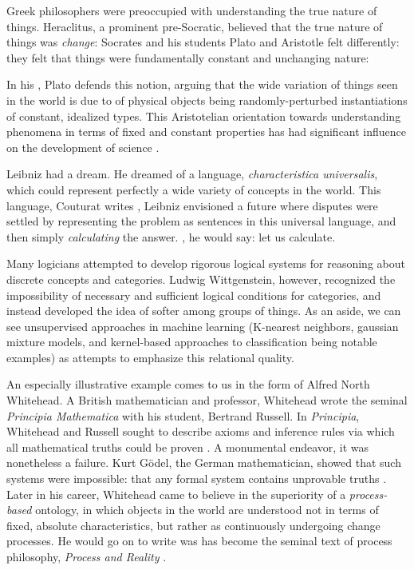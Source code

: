 \documentclass[12pt]{book}
\begin{document}
\bigskip

Greek philosophers were preoccupied with understanding the true nature of things.
Heraclitus, a prominent pre-Socratic, believed that the true nature of things was \textit{change}: 
Socrates and his students Plato and Aristotle felt differently: they felt that things were fundamentally constant and unchanging nature: 

In his , Plato defends this notion, arguing that the wide variation of things seen in the world is due to of physical objects being randomly-perturbed instantiations of constant, idealized types.
This Aristotelian orientation towards understanding phenomena in terms of fixed and constant properties has had significant influence on the development of science \cite{pirsig}.

\bigskip

Leibniz had a dream.
He dreamed of a language, \textit{characteristica universalis}, which could represent perfectly a wide variety of concepts in the world.
This language, Couturat writes \cite{couturat}, 
Leibniz envisioned a future where disputes were settled by representing the problem as sentences in this universal language, and then simply \textit{calculating} the answer.
, he would say: let us calculate.

Many logicians attempted to develop rigorous logical systems for reasoning about discrete concepts and categories.
Ludwig Wittgenstein, however, recognized the impossibility of necessary and sufficient logical conditions for categories, and instead developed the idea of softer  among groups of things.
As an aside, we can see unsupervised approaches in machine learning (K-nearest neighbors, gaussian mixture models, and kernel-based approaches to classification being notable examples) as attempts to emphasize this relational quality.

\bigskip

An especially illustrative example comes to us in the form of Alfred North Whitehead.
A British mathematician and professor, Whitehead wrote the seminal \textit{Principia Mathematica} with his student, Bertrand Russell.
In \textit{Principia}, Whitehead and Russell sought to describe axioms and inference rules via which all mathematical truths could be proven \cite{doxiadis}.
A monumental endeavor, it was nonetheless a failure.
Kurt G{\"o}del, the German mathematician, showed that such systems were impossible: that any formal system contains unprovable truths \cite{hofstadter}.
Later in his career, Whitehead came to believe in the superiority of a \textit{process-based} ontology, in which objects in the world are understood not in terms of fixed, absolute characteristics, but rather as continuously undergoing change processes.
He would go on to write was has become the seminal text of process philosophy, \textit{Process and Reality} \cite{whitehead}.
\end{document}
